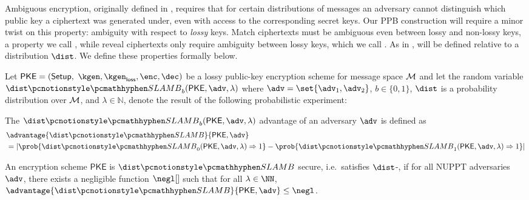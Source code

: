 Ambiguous encryption, originally defined in \cite{CCS:BLMG21}, requires that for certain distributions of messages an adversary cannot distinguish which public key a ciphertext was generated under, even with access to the corresponding secret keys.
Our PPB construction will require a minor twist on this property: ambiguity with respect to \emph{lossy} keys.
Match ciphertexts must be ambiguous even between lossy and non-lossy keys, a property we call \emph{\sla}, while reveal ciphertexts only require ambiguity between lossy keys, which we call \emph{\wla}.
As in \cite{CCS:BLMG21}, \sla{} will be defined relative to a distribution $\dist$.
We define these properties formally below.

\begin{definition} \label{def:amb}
	Let $\mathsf{PKE} = (\mathsf{Setup}, $ $\kgen, \kgenlossy,\allowbreak \enc,\allowbreak \dec)$ be a lossy public-key encryption scheme for message space $\mathcal{M}$ and let the random variable $\slambgame_b(\mathsf{PKE}, \adv, \lambda)$ where $\adv = \set{\adv_1, \adv_2}$, $b \in\{0,1\}$, $\dist$ is a probability distribution over $\mathcal{M}$, and $\lambda \in \mathbb{N}$, denote the result of the following probabilistic experiment:



	The $\slambgame_b(\mathsf{PKE}, \adv, \lambda)$ advantage of an adversary $\adv$ is defined as
	\begin{align*}
		 & \advantage{\slambgame}{\pke, \adv} \\
		 & =
		\left|
		\prob{\slambgame_0(\pke, \adv, \secpar) \Rightarrow 1} -
		\prob{\slambgame_1(\pke, \adv, \secpar) \Rightarrow 1}
		\right|
	\end{align*}

	An encryption scheme $\mathsf{PKE}$ is $\slambgame$ secure, i.e.\ satisfies $\dist$-\sla{}, if for all NUPPT adversaries $\adv$, there exists a negligible function $\negl[]$ such that for all $\secpar \in \NN$, $\advantage{\slambgame}{\pke, \adv} \leq \negl$.

\end{definition}

